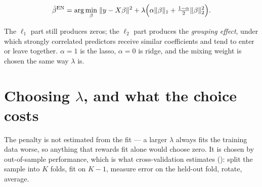 \documentclass[
  letterpaper,
  10pt,
  twoside,
  openright,
  numbers=noenddot,
  chapterprefix=true]{scrbook}
\begin{document}
\[
\hat\beta^{\text{EN}} = \arg\min_\beta \thickspace
\lVert y - X\beta\rVert^2
+ \lambda\Big(\alpha \lVert\beta\rVert_1 + \tfrac{1-\alpha}{2}\lVert\beta\rVert_2^2\Big).
\]

The \(\ell_1\) part still produces zeros; the \(\ell_2\) part produces
the \emph{grouping effect}, under which strongly correlated predictors
receive similar coefficients and tend to enter or leave together.
\(\alpha = 1\) is the lasso, \(\alpha = 0\) is ridge, and the mixing
weight is chosen the same way \(\lambda\) is.

\section{\texorpdfstring{Choosing \(\lambda\), and what the choice
costs}{Choosing \textbackslash lambda, and what the choice costs}}\label{choosing-lambda-and-what-the-choice-costs}

The penalty is not estimated from the fit --- a larger \(\lambda\)
always fits the training data worse, so anything that rewards fit alone
would choose zero. It is chosen by out-of-sample performance, which is
what cross-validation estimates (): split the sample into \(K\) folds, fit on \(K-1\), measure error
on the held-out fold, rotate, average.
\end{document}
